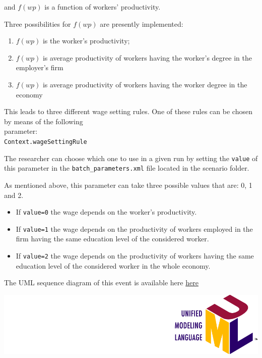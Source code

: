 \documentclass{book}
\newcommand{\umllocation}{file:///Users/giulioni/Dropbox/svn/sfcabm_my/documentation}
\begin{document}
\vskip2mm
and $f(wp)$ is a function of workers' productivity.

Three possibilities for $f(wp)$ are presently implemented:
\begin{enumerate}
	\item $f(wp)$ is the worker's productivity;
	\item $f(wp)$ is average productivity of workers having the worker's degree in the employer's firm
	\item $f(wp)$ is average productivity of workers having the worker degree in the economy
\end{enumerate}


This leads to three different wage setting rules. One of these rules can be chosen by means of the following\\
parameter:\\
\verb+Context.wageSettingRule+

The researcher can choose which one to use in a given run by setting the \verb+value+ of this parameter in the \verb+batch_parameters.xml+ file located in the scenario folder.

As mentioned above, this parameter can take three possible values that are: 0, 1 and 2.

\begin{itemize}
	\item 
		If \verb+value=0+ the wage depends on the worker's productivity.
	\item 
		If \verb+value=1+ the wage depends on the productivity of workers employed in the firm having the same education level of the considered worker.
	\item 
		If \verb+value=2+ the wage depends on the productivity of workers having the same education level of the considered worker in the whole economy.

\end{itemize}

The UML sequence diagram of this event is available here \href{\umllocation/setWorkersWage.html}{here}
\begin{marginfigure}
	\includegraphics[scale=0.1]{uml.png}
\end{marginfigure}
\end{document}
